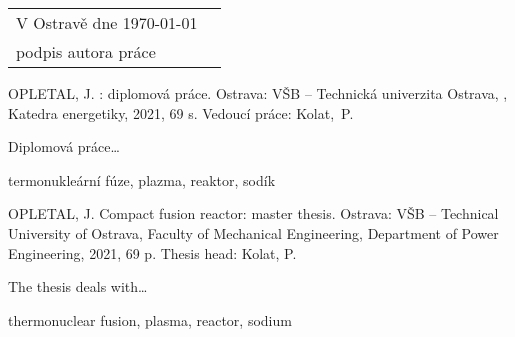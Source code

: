 \documentclass[main.tex]{subfiles}
\begin{document}
\vfill


\begin{tabularx}{\textwidth}{@{}Xl}
V Ostravě dne \today &
\begin{tabular}[t]{c}
.................................. \\[-10pt]
  podpis autora práce
\end{tabular} \\
\end{tabularx}

\vspace{3em}

\clearpage


\noindent\large\textbf{}
\bigskip\par

\noindent\normalsize OPLETAL, J. \@title: diplomová práce. Ostrava: VŠB – Technická univerzita Ostrava, \@faculty,
Katedra energetiky, 2021, 69 s. Vedoucí práce: Kolat,~P.

\medskip

Diplomová práce\ldots
\bigskip


\bigskip
\textbf{} termonukleární fúze, plazma, reaktor, sodík


\vspace{3em}
\noindent\large\textbf{}
\bigskip\par

\noindent\normalsize OPLETAL, J. Compact fusion reactor:
master thesis. Ostrava: VŠB – Technical University of Ostrava, Faculty of Mechanical
Engineering, Department of Power Engineering, 2021, 69 p. Thesis head: Kolat, P.

\medskip

The thesis deals with\ldots
\bigskip


\bigskip
\textbf{} thermonuclear fusion, plasma, reactor, sodium
\end{document}

